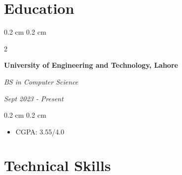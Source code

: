 \documentclass[10pt, a4paper]{article}
\newenvironment{highlights}{
    \begin{itemize}[
        topsep=0.1 cm,
        parsep=0.1 cm,
        partopsep=0pt,
        itemsep=0pt,
        leftmargin=0.4 cm + 10pt
    ]
}{
    \end{itemize}
} %
\newenvironment{onecolentry}{
    \begin{adjustwidth}{
        0.2 cm
    }{
        0.2 cm
    }
}{
    \end{adjustwidth}
} %
\newenvironment{twocolentry}[2][]{
    \onecolentry
    \def\secondColumn{#2}
    \begin{paracol}{2}
}{
    \switchcolumn \raggedleft \secondColumn
    \end{paracol}
    \endonecolentry
} %
\newcommand{\createpointblock}[5]{
    \begin{twocolentry}{
        \textit{#2}

        \textit{#4}}
        \textbf{#1}

        \textit{#3}
    \end{twocolentry}

    \vspace{0.1 cm}
    \begin{onecolentry}
        \begin{highlights}
            #5
        \end{highlights}
    \end{onecolentry}
}
\begin{document}
\section{Education}

    \createpointblock{University of Engineering and Technology, Lahore}{Sept 2023 - Present}{BS in Computer Science}{}
    {%
        \item CGPA: 3.55/4.0
    }

\section{Technical Skills}

\end{document}
